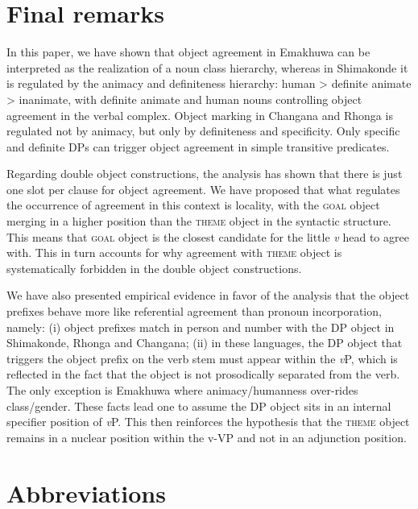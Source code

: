 \documentclass[output=paper]{langsci/langscibook}
\begin{document}
\section{Final remarks}\label{sec:nguna:5}

In this paper, we have shown that object agreement in Emakhuwa can be interpreted as the realization of a noun class hierarchy, whereas in Shimakonde it is regulated by the animacy and definiteness hierarchy: human > definite animate > inanimate, with definite animate and human nouns controlling object agreement in the verbal complex. Object marking in Changana and Rhonga is regulated not by animacy, but only by definiteness and specificity. Only specific and definite DPs can trigger object agreement in simple transitive predicates.

Regarding double object constructions, the analysis has shown that there is just one slot per clause for object agreement. We have proposed that what regulates the occurrence of agreement in this context is locality, with the \textsc{goal} object merging in a higher position than the \textsc{theme} object in the syntactic structure. This means that \textsc{goal} object is the closest candidate for the little {\textit{v}} head to agree with. This in turn accounts for why agreement with \textsc{theme} object is systematically forbidden in the double object constructions. 

We have also presented empirical evidence in favor of the analysis that the object prefixes behave more like referential agreement than pronoun incorporation, namely: (i) object prefixes match in person and number with the DP object in Shimakonde, Rhonga and Changana; (ii) in these languages, the DP object that triggers the object prefix on the verb stem must appear within the \textit{v}P, which is reflected in the fact that the object is not prosodically separated from the verb. The only exception is Emakhuwa where animacy/humanness over-rides class/gender. These facts lead one to assume the DP object sits in an internal specifier position of \textit{v}P. This then reinforces the hypothesis that the \textsc{theme} object remains in a nuclear position within the v-VP and not in an adjunction position.

\section*{Abbreviations}
\end{document}
